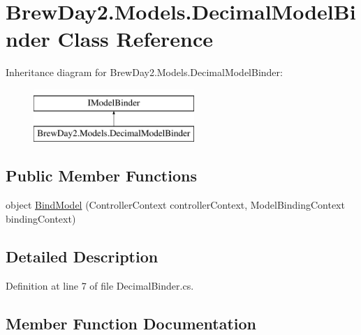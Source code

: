 \hypertarget{class_brew_day2_1_1_models_1_1_decimal_model_binder}{}\section{Brew\+Day2.\+Models.\+Decimal\+Model\+Binder Class Reference}
\label{class_brew_day2_1_1_models_1_1_decimal_model_binder}
Inheritance diagram for Brew\+Day2.\+Models.\+Decimal\+Model\+Binder\+:\begin{figure}[H]
\begin{center}
\leavevmode
\includegraphics[height=2.000000cm]{class_brew_day2_1_1_models_1_1_decimal_model_binder}
\end{center}
\end{figure}
\subsection*{Public Member Functions}
\begin{DoxyCompactItemize}
\item 
object \mbox{\hyperlink{class_brew_day2_1_1_models_1_1_decimal_model_binder_ad7a5616bdadc43173446c1cc1489fcd7}{Bind\+Model}} (Controller\+Context controller\+Context, Model\+Binding\+Context binding\+Context)
\end{DoxyCompactItemize}


\subsection{Detailed Description}


Definition at line 7 of file Decimal\+Binder.\+cs.



\subsection{Member Function Documentation}
\mbox{\label{class_brew_day2_1_1_models_1_1_decimal_model_binder_ad7a5616bdadc43173446c1cc1489fcd7}} 
